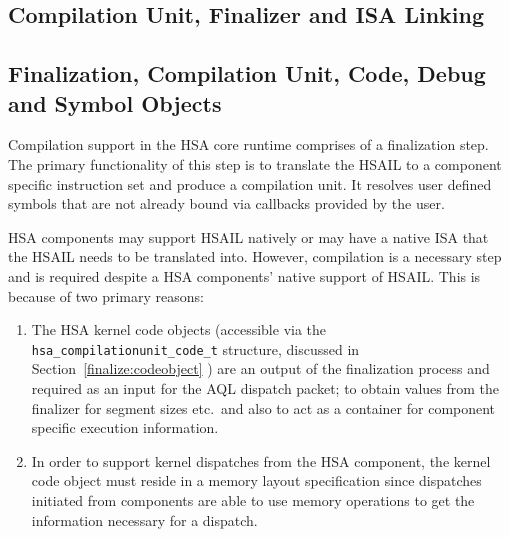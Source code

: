 \documentclass{book}
\begin{document}

%

\begin{appendices}

\chapter{Compilation Unit, Finalizer and ISA Linking}
\label{finalizerchapter} \hypertarget{finalizerchapter}{}
\hypertarget{finalizer}{}\section{Finalization, Compilation Unit,
Code, Debug and Symbol Objects}\label{finalizer}

Compilation support in the HSA core runtime comprises of a
finalization step. The primary functionality of this step is to
translate the HSAIL to a component specific instruction set and
produce a compilation unit. It resolves user defined symbols that
are not already bound via callbacks provided by the user.

HSA components may support HSAIL natively or may have a native ISA
that the HSAIL needs to be translated into. However, compilation is a
necessary step and is required despite a HSA components' native support
of HSAIL. This is because of two primary reasons:

\begin{enumerate}
\item  The HSA kernel code objects (accessible via the
\texttt{hsa\_compilationunit\_code\_t} structure, discussed in
Section~\ref{finalize:codeobject} ) are an output of the
finalization process and required as an input for the AQL dispatch
packet; to obtain values from the finalizer for segment sizes etc.\
and also to act as a container for component specific execution
information.

\item In order to support kernel dispatches from the HSA
component, the kernel code object must reside in a memory layout
specification since dispatches initiated from components are able
to use memory operations to get the information necessary for a
dispatch.
\end{enumerate}


\end{appendices}
\end{document}
